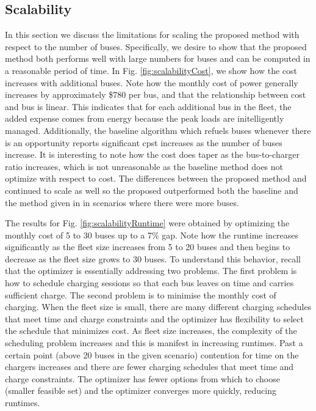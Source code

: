 \subsection{Scalability\label{sec:results:scalability}}


In this section we discuss the limitations for scaling the proposed method with respect to the number of buses. Specifically, we desire to show that the proposed method both performs well with large numbers for buses and can be computed in a reasonable period of time. In Fig. \ref{fig:scalabilityCost}, we show how the cost increases with additional buses. Note how the monthly cost of power generally increases by approximately \$780 per bus, and that the relationship between cost and bus is linear. This indicates that for each additional bus in the fleet, the added expense comes from energy because the peak loads are initelligently managed. Additionally, the baseline algorithm which refuels buses whenever there is an opportunity reports significant cpst increases as the number of buses increase. It is interesting to note how the cost does taper as the bus-to-charger ratio increases, which is not unreasonable as the baseline method does not optimize with respect to cost. The differences between the proposed method and \cite{He_2019_Fast} continued to scale as well so the proposed outperformed both the baseline and the method given in \cite{He_2019_Fast} in scenarios where there were more buses. 
\par The results for Fig. \ref{fig:scalabilityRuntime} were obtained by optimizing the monthly cost of 5 to 30 buses up to a 7\% gap.  Note how the runtime increases significantly as the fleet size increases from 5 to 20 buses and then begins to decrease as the fleet size grows to 30 buses.  To understand this behavior, recall that the optimizer is essentially addressing two problems. The first problem is how to schedule charging sessions so that each bus leaves on time and carries sufficient charge. The second problem is to minimise the monthly cost of charging. When the fleet size is small, there are many different charging schedules that meet time and charge constraints and the optimizer has flexibility to select the schedule that minimizes cost. As fleet size increases, the complexity of the scheduling problem increases and this is manifest in increasing runtimes.  Past a certain point (above 20 buses in the given scenario) contention for time on the chargers increases and there are fewer charging schedules that meet time and charge constraints.  The optimizer has fewer options from which to choose (smaller feasible set) and the optimizer converges more quickly, reducing runtimes.
